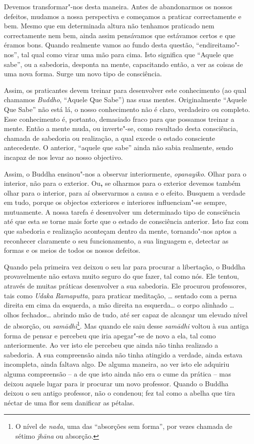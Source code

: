 Devemos transformar"-nos desta maneira. Antes de abandonarmos os nossos
defeitos, mudamos a nossa perspectiva e começamos a praticar
correctamente e bem. Mesmo que em determinada altura não tenhamos
praticado nem correctamente nem bem, ainda assim pensávamos que
estávamos certos e que éramos bons. Quando realmente vamos ao fundo
desta questão, ``endireitamo"-nos'', tal qual como virar uma mão para
cima. Isto significa que ``Aquele que sabe'', ou a sabedoria, desponta
na mente, capacitando então, a ver as coisas de uma nova forma. Surge um
novo tipo de consciência.

Assim, os praticantes devem treinar para desenvolver este conhecimento
(ao qual chamamos \emph{Buddho}, ``Aquele Que Sabe'') nas suas mentes.
Originalmente ``Aquele Que Sabe'' não está lá, o nosso conhecimento não
é claro, verdadeiro ou completo. Esse conhecimento é, portanto,
demasiado fraco para que possamos treinar a mente. Então a mente muda,
ou inverte"-se, como resultado desta consciência, chamada de sabedoria ou
realização, a qual excede o estado consciente antecedente. O anterior,
``aquele que sabe'' ainda não sabia realmente, sendo incapaz de nos
levar ao nosso objectivo.

Assim, o Buddha ensinou"-nos a observar interiormente, \emph{opanayiko}.
Olhar para o interior, não para o exterior. Ou\textbf{,} se olharmos
para o exterior devemos também olhar para o interior, para aí
observarmos a causa e o efeito. Busquem a verdade em tudo, porque os
objectos exteriores e interiores influenciam"-se sempre, mutuamente. A
nossa tarefa é desenvolver um determinado tipo de consciência até que
esta se torne mais forte que o estado de consciência anterior. Isto faz
com que sabedoria e realização aconteçam dentro da mente, tornando"-nos
aptos a reconhecer claramente o seu funcionamento, a sua linguagem e,
detectar as formas e os meios de todos os nossos defeitos.

Quando pela primeira vez deixou o seu lar para procurar a libertação, o
Buddha provavelmente não estava muito seguro do que fazer, tal como nós.
Ele tentou, através de muitas práticas desenvolver a sua sabedoria. Ele
procurou professores, tais como \emph{Udaka} \emph{Ramaputta}, para
praticar meditação, \ldots{} sentado com a perna direita em cima da
esquerda, a mão direita na esquerda\ldots{} o corpo alinhado \ldots{}
olhos fechados\ldots{} abrindo mão de tudo, até ser capaz de alcançar um
elevado nível de absorção, ou \emph{samādhi}\footnote{%
  O nível de \emph{nada}, uma das ``absorções sem forma'', por vezes
  chamada de sétimo \emph{jhāna} ou absorção.}.
Mas quando ele saiu
desse \emph{samādhi} voltou à sua antiga forma de pensar e percebeu que
iria apegar"-se de novo a ela, tal como anteriormente. Ao ver isto ele
percebeu que ainda não tinha realizado a sabedoria. A sua compreensão
ainda não tinha atingido a verdade, ainda estava incompleta, ainda
faltava algo. De alguma maneira, ao ver isto ele adquiriu alguma
compreensão -- a de que isto ainda não era o cume da prática -- mas
deixou aquele lugar para ir procurar um novo professor. Quando o Buddha
deixou o seu antigo professor, não o condenou; fez tal como a abelha que
tira néctar de uma flor sem danificar as pétalas.


